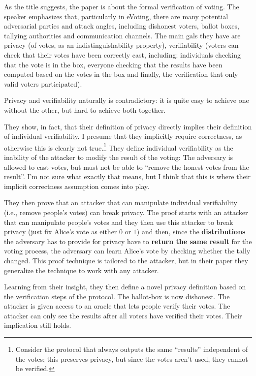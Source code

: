 \documentclass{article}
\begin{document}
As the title suggests, the paper is about the formal verification of voting.
The speaker emphasizes that, particularly in eVoting, there are many potential adversarial parties and attack angles, including dishonest voters, ballot boxes, tallying authorities and communication channels. The main gals they have are privacy (of votes, as an indistinguishability property), verifiability (voters can check that their votes have been correctly cast, including: individuals checking that the vote is in the box, everyone checking that the results have been computed based on the votes in the box and finally, the verification that only valid voters participated).

Privacy and verifiability naturally is contradictory: it is quite easy to achieve one without the other, but hard to achieve both together.

They show, in fact, that their definition of privacy directly implies their definition of individual verifiability. I presume that they implicitly require correctness, as otherwise this is clearly not true.\footnote{Consider the protocol that always outputs the same ``results'' independent of the votes; this preserves privacy, but since the votes aren't used, they cannot be verified.}
They define individual verifiability as the inability of the attacker to modify the result of the voting: The adversary is allowed to cast votes, but must not be able to ``remove the honest votes from the result''. I'm not sure what exactly that means, but I think that this is where their implicit correctness assumption comes into play. 

They then prove that an attacker that can manipulate individual verifiability (i.e., remove people's votes) can break privacy. The proof starts with an attacker that can manipulate people's votes and they then use this attacker to break privacy (just fix Alice's vote as either $0$ or $1$) and then, since the \textbf{distributions} the adversary has to provide for privacy have to \textbf{return the same result} for the voting process, the adversary can learn Alice's vote by checking whether the tally changed. This proof technique is tailored to the attacker, but in their paper they generalize the technique to work with any attacker.

Learning from their insight, they then define a novel privacy definition based on the verification steps of the protocol. The ballot-box is now dishonest. The attacker is given access to an oracle that lets people verify their votes. The attacker can only see the results after all voters have verified their votes. Their implication still holds.
\end{document}

